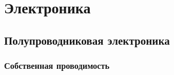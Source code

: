 \section{Электроника}

\subsection{Полупроводниковая электроника}
\subsubsection{Собственная проводимость}
